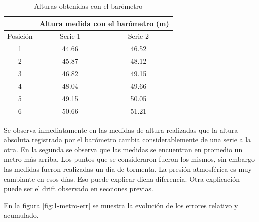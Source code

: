 \documentclass[main]{subfiles}
\begin{document}
\begin{table}[H]
\centering
\begin{tabular}{c|c|c|} 
	& \multicolumn{2}{|p{200pt}|}{\cellcolor[gray]{0.8} Altura medida con el barómetro (m)}      \\ \hline
\cellcolor[gray]{0.8} {Posición} & \cellcolor[gray]{0.8} {Serie 1} &\cellcolor[gray]{0.8} {Serie 2}\\ \hline

\multicolumn{1}{|c|}{1} & 44.66 & 46.52 \\ \hline
\multicolumn{1}{|c|}{2} & 45.87 & 48.12\\ \hline
\multicolumn{1}{|c|}{3} & 46.82 & 49.15\\ \hline
\multicolumn{1}{|c|}{4} & 48.04 & 49.66\\ \hline
\multicolumn{1}{|c|}{5} & 49.15 & 50.05\\ \hline
\multicolumn{1}{|c|}{6} & 50.66 & 51.21 \\ \hline

\end{tabular}
\caption{Alturas obtenidas con el barómetro}
\label{tab:alturasm}
\end{table}

Se observa inmediatamente en las medidas de altura realizadas que la altura absoluta registrada por el barómetro cambia considerablemente de una serie a la otra. En la segunda se observa que las medidas se encuentran en promedio un metro más arriba. Los puntos que se consideraron fueron los mismos, sin embargo las medidas fueron realizadas un día de tormenta. La presión atmosférica es muy cambiante en esos días. Eso puede explicar dicha diferencia. Otra explicación puede ser el drift observado en secciones previas.

En la figura \ref{fig:1-metro-err} se muestra la evolución de los errores relativo y acumulado.
\end{document}
